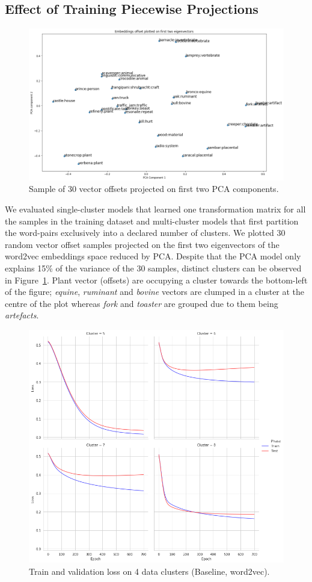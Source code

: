 \subsection{Effect of Training Piecewise Projections}
\begin{figure}[ht!] 
  \centering
  \includegraphics[width=0.75\linewidth]{images/Sample_of_30_vector_offsets_PCA.png}
  \caption{Sample of 30 vector offsets projected on first two PCA components.}
  \label{fig:cluster_30_samp_pca}
\end{figure}
We evaluated single-cluster models that learned one transformation matrix for all the samples in the training dataset and multi-cluster models that first partition the word-pairs exclusively into a declared number of clusters.  We plotted 30 random vector offset samples projected on the first two eigenvectors of the word2vec embeddings space reduced by \ac{PCA}.  Despite that the PCA model only explains 15\% of the variance of the 30 samples, distinct clusters can be observed in Figure~\ref{fig:cluster_30_samp_pca}.  Plant vector (offsets) are occupying a cluster towards the bottom-left of the figure; \textit{equine}, \textit{ruminant} and \textit{bovine} vectors are clumped in a cluster at the centre of the plot whereas \textit{fork} and \textit{toaster} are grouped due to them being \textit{artefacts}.

\begin{figure}[ht!] 
  \centering
  \includegraphics[width=0.75\linewidth]{images/Train_losses_4_clusters_baseline_w2v.png}
  \caption{Train and validation loss on 4 data clusters (Baseline, word2vec).}
  \label{fig:train_test_loss_w2v}
\end{figure}

